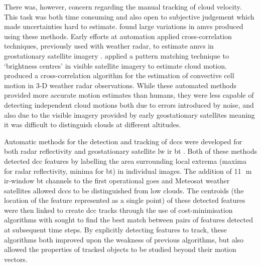 There was, however, concern regarding the manual tracking of cloud velocity.
This task was both time consuming and also open to subjective judgement which made uncertainties hard to estimate.
\citet{fujita_satellite-tracked_1975} found large variations in \acrshort{amv}s produced using these methods.
Early efforts at automation applied cross-correlation techniques, previously used with weather radar, to estimate \acrshort{amv}s in geostationary satellite imagery \citep{leese_determination_1970}.
\citet{endlich_use_1971} applied a pattern matching technique to `brightness centres' in visible satellite imagery to estimate cloud motion.
\citet{rinehart_three-dimensional_1978} produced a cross-correlation algorithm for the estimation of convective cell motion in 3-D weather radar observations.
While these automated methods provided more accurate motion estimates than humans, they were less capable of detecting independent cloud motions both due to errors introduced by noise, and also due to the visible imagery provided by early geostationary satellites meaning it was difficult to distinguish clouds at different altitudes.

Automatic methods for the detection and tracking of \acrshort{dcc}s were developed for both radar reflectivity \citep{crane_automatic_1979} and geostationary satellite \acrshort{lw} \acrfull{ir} \acrfull{bt} \citep{endlich_automatic_1981}.
Both of these methods detected \acrshort{dcc} features by labelling the area surrounding local extrema (maxima for radar reflectivity, minima for \acrshort{bt}) in individual images.
The addition of 11\,\unit{\mu m} \acrshort{ir}-window \acrshort{bt} channels to the first operational \acrshort{goes} and Meteosat weather satellites allowed \acrshort{dcc}s to be distinguished from low clouds.
The centroids (the location of the feature represented as a single point) of these detected features were then linked to create \acrshort{dcc} tracks through the use of cost-minimisation algorithms with sought to find the best match between pairs of features detected at subsequent time steps.
By explicitly detecting features to track, these algorithms both improved upon the weakness of previous algorithms, but also allowed the properties of tracked objects to be studied beyond their motion vectors.

